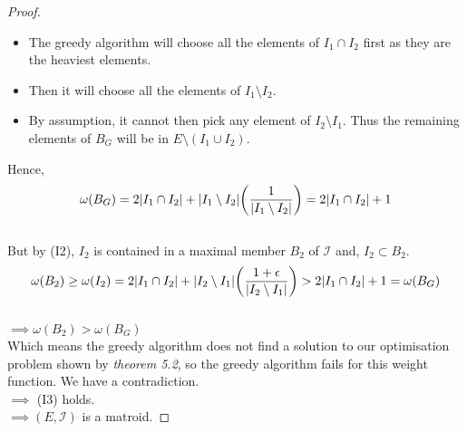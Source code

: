 \documentclass[../main.tex]{subfiles}
\begin{document}
\begin{proof}
\begin{itemize}
\item The greedy algorithm will choose all the elements of $I_1 \cap I_2$ first as they are the heaviest elements.
\item Then it will choose all the elements of $I_1 \setminus I_2.$
\item By assumption, it cannot then pick any element of $I_2 \setminus I_1.$ Thus the remaining elements of $B_G$ will be in $E \setminus (I_1 \cup I_2).$\\
\end{itemize}
Hence,\[
\omega(B_G) = 2|I_1 \cap I_2| + |I_1 \setminus I_2| \bigg( \frac{1}{|I_1 \setminus I_2|} \bigg) \\
= 2|I_1 \cap I_2| + 1
\]\\
But by (I2), $I_2$ is contained in a maximal member $B_2$ of $\mathcal{I}$ and, $I_2 \subset B_2.$\\
\[
\omega(B_2) \geq \omega(I_2) = 2|I_1 \cap I_2| + |I_2 \setminus I_1| \bigg(\frac{1+\epsilon}{|I_2 \setminus I_1|} \bigg)\\
> 2|I_1 \cap I_2| + 1 = \omega(B_G)
\]\\
$\implies \omega(B_2) > \omega(B_G)$\\
Which means the greedy algorithm does not find a solution to our optimisation problem shown by \textit{theorem 5.2}, so the greedy algorithm fails for this weight function. We have a contradiction.\\
$\implies$ (I3) holds.\\
$\implies (E,\mathcal{I})$ is a matroid.
\end{proof}
\end{document}
